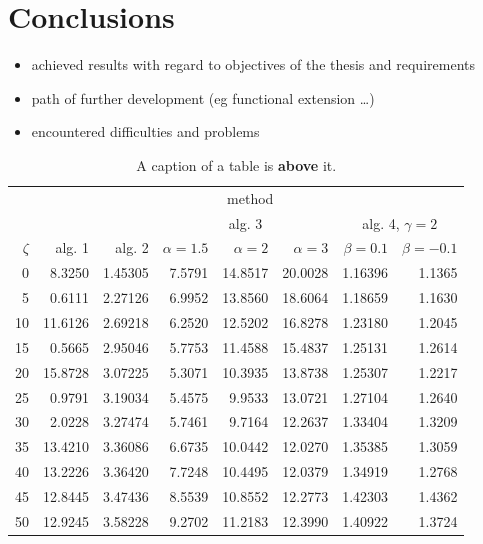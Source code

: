 \documentclass[a4paper,twoside,12pt]{book}
\begin{document}
\chapter{Conclusions}
\begin{itemize}
\item achieved results with regard to objectives of the thesis and requirements
\item path of further development (eg functional extension …)
\item encountered difficulties and problems
\end{itemize}


\begin{table}
\centering
\caption{A caption of a table is \textbf{above} it.}
\label{id:tab:wyniki}
\begin{tabular}{rrrrrrrr}
\toprule
	         &                                     \multicolumn{7}{c}{method}                                      \\
	         \cmidrule{2-8}
	         &         &         &        \multicolumn{3}{c}{alg. 3}        & \multicolumn{2}{c}{alg. 4, $\gamma = 2$} \\
	         \cmidrule(r){4-6}\cmidrule(r){7-8}
	$\zeta$ &     alg. 1 &   alg. 2 & $\alpha= 1.5$ & $\alpha= 2$ & $\alpha= 3$ &   $\beta = 0.1$  &   $\beta = -0.1$ \\
\midrule
	       0 &  8.3250 & 1.45305 &       7.5791 &    14.8517 &    20.0028 & 1.16396 &                       1.1365 \\
	       5 &  0.6111 & 2.27126 &       6.9952 &    13.8560 &    18.6064 & 1.18659 &                       1.1630 \\
	      10 & 11.6126 & 2.69218 &       6.2520 &    12.5202 &    16.8278 & 1.23180 &                       1.2045 \\
	      15 &  0.5665 & 2.95046 &       5.7753 &    11.4588 &    15.4837 & 1.25131 &                       1.2614 \\
	      20 & 15.8728 & 3.07225 &       5.3071 &    10.3935 &    13.8738 & 1.25307 &                       1.2217 \\
	      25 &  0.9791 & 3.19034 &       5.4575 &     9.9533 &    13.0721 & 1.27104 &                       1.2640 \\
	      30 &  2.0228 & 3.27474 &       5.7461 &     9.7164 &    12.2637 & 1.33404 &                       1.3209 \\
	      35 & 13.4210 & 3.36086 &       6.6735 &    10.0442 &    12.0270 & 1.35385 &                       1.3059 \\
	      40 & 13.2226 & 3.36420 &       7.7248 &    10.4495 &    12.0379 & 1.34919 &                       1.2768 \\
	      45 & 12.8445 & 3.47436 &       8.5539 &    10.8552 &    12.2773 & 1.42303 &                       1.4362 \\
	      50 & 12.9245 & 3.58228 &       9.2702 &    11.2183 &    12.3990 & 1.40922 &                       1.3724 \\
\bottomrule
\end{tabular}
\end{table}
\end{document}
